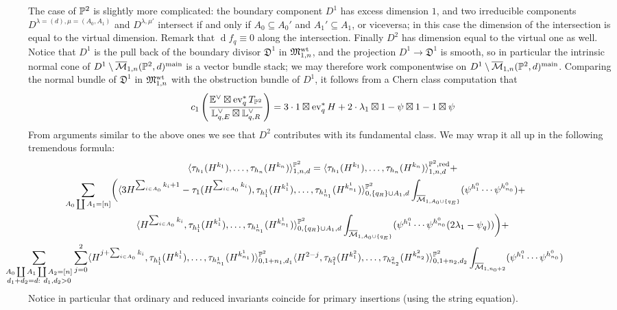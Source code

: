 The case of $\mathbb P^2$ is slightly more complicated: the boundary component $D^1$ has excess dimension $1$, and two irreducible components $D^{\lambda=(d),\mu=(A_0,A_1)}$ and $D^{\lambda,\mu'}$ intersect if and only if $A_0\subseteq A_0'$ and $A_1'\subseteq A_1$, or viceversa; in this case the dimension of the intersection is equal to the virtual dimension. Remark that $\operatorname{d}\!f_q\equiv 0$ along the intersection. Finally $D^2$ has dimension equal to the virtual one as well. Notice that $D^1$ is the pull back of the boundary divisor $\mathfrak{D}^1$ in $\mathfrak M_{1,n}^{\mathrm{wt}}$, and the projection $D^1\to \mathfrak{D}^1$ is smooth, so in particular the intrinsic normal cone of $D^1\setminus \overline{\mathcal{M}}_{1,n}(\mathbb P^2,d)^{\mathrm{main}}$ is a vector bundle stack; we may therefore work componentwise on $D^1\setminus \overline{\mathcal{M}}_{1,n}(\mathbb P^2,d)^{\mathrm{main}}$. Comparing the normal bundle of $\mathfrak{D}^1$ in $\mathfrak M_{1,n}^{\mathrm{wt}}$ with the obstruction bundle of $D^1$, it follows from a Chern class computation that \[c_1\left(\frac{\mathbb E^\vee\boxtimes \operatorname{ev}_q^*T_{\mathbb P^2}}{\mathbb L_{q,E}^\vee\boxtimes \mathbb L_{q,R}^\vee}\right)=3\cdot1\boxtimes\operatorname{ev}_q^*H+2\cdot\lambda_1\boxtimes1-\psi\boxtimes1-1\boxtimes\psi\]
From arguments similar to the above ones we see that $D^2$ contributes with its fundamental class. We may wrap it all up in the following tremendous formula:
\begin{multline*}
 \langle \tau_{h_1}(H^{k_1}),\ldots,\tau_{h_n}(H^{k_n})\rangle^{\PP^2}_{1,n,d}= \langle \tau_{h_1}(H^{k_1}),\ldots,\tau_{h_n}(H^{k_n})\rangle^{\PP^2,\mathrm{red}}_{1,n,d}+\\
 \hspace{-2cm}\sum_{A_0\coprod A_1=[n]}\biggr(\langle 3H^{\sum _{i\in A_0}k_i+1}-\tau_1(H^{\sum_{i\in A_0}k_i}),\tau_{h^1_1}(H^{k^1_1}),\ldots,\tau_{h^1_{n_1}}(H^{k^1_{n_1}})\rangle^{\PP^2}_{0,\{q_R\}\cup A_1,d}\int_{\oM_{1,A_0\cup \{q_E\}}}(\psi^{h^0_1}\cdots\psi^{h^0_{n_0}})+\\
 \langle H^{\sum _{i\in A_0}k_i},\tau_{h^1_1}(H^{k^1_1}),\ldots,\tau_{h^1_{n_1}}(H^{k^1_{n_1}})\rangle^{\PP^2}_{0,\{q_R\}\cup A_1,d}\int_{\oM_{1,A_0\cup \{q_E\}}}( \psi^{h^0_1}\cdots\psi^{h^0_{n_0}}(2\lambda_1-\psi_q))\biggr)+\\
 \hspace{-2.8cm}\sum_{\substack{A_0\coprod A_1\coprod A_2=[n]\\ d_1+d_2=d:\ d_1,d_2>0}}\sum_{j=0}^2\langle H^{j+\sum _{i\in A_0}k_i},\tau_{h^1_1}(H^{k^1_1}),\ldots,\tau_{h^1_{n_1}}(H^{k^1_{n_1}})\rangle^{\PP^2}_{0,1+n_1,d_1}\langle H^{2-j},\tau_{h^2_1}(H^{k^2_1}),\ldots,\tau_{h^2_{n_2}}(H^{k^2_{n_2}})\rangle^{\PP^2}_{0,1+n_2,d_2}\int_{\oM_{1,n_0+2}} (\psi^{h^0_1}\cdots\psi^{h^0_{n_0}})
\end{multline*}
Notice in particular that ordinary and reduced invariants coincide for primary insertions (using the string equation).

